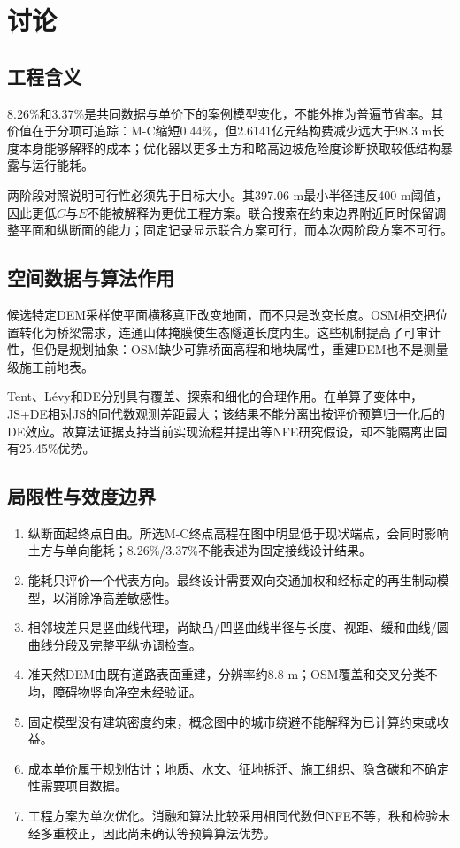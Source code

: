 \documentclass[preprint,12pt]{elsarticle}
\begin{document}
\section{讨论}

\subsection{工程含义}

8.26\%和3.37\%是共同数据与单价下的案例模型变化，不能外推为普遍节省率。其价值在于分项可追踪：M-C缩短0.44\%，但2.6141亿元结构费减少远大于98.3 m长度本身能够解释的成本；优化器以更多土方和略高边坡危险度诊断换取较低结构暴露与运行能耗。

两阶段对照说明可行性必须先于目标大小。其397.06 m最小半径违反400 m阈值，因此更低$C$与$E$不能被解释为更优工程方案。联合搜索在约束边界附近同时保留调整平面和纵断面的能力；固定记录显示联合方案可行，而本次两阶段方案不可行。

\subsection{空间数据与算法作用}

候选特定DEM采样使平面横移真正改变地面，而不只是改变长度。OSM相交把位置转化为桥梁需求，连通山体掩膜使生态隧道长度内生。这些机制提高了可审计性，但仍是规划抽象：OSM缺少可靠桥面高程和地块属性，重建DEM也不是测量级施工前地表。

Tent、L\'evy和DE分别具有覆盖、探索和细化的合理作用。在单算子变体中，JS+DE相对JS的同代数观测差距最大；该结果不能分离出按评价预算归一化后的DE效应。故算法证据支持当前实现流程并提出等NFE研究假设，却不能隔离出固有25.45\%优势。

\subsection{局限性与效度边界}\label{sec:limitations_zh}

\begin{enumerate}[leftmargin=*,label=(\arabic*)]
\item 纵断面起终点自由。所选M-C终点高程在图中明显低于现状端点，会同时影响土方与单向能耗；8.26\%/3.37\%不能表述为固定接线设计结果。
\item 能耗只评价一个代表方向。最终设计需要双向交通加权和经标定的再生制动模型，以消除净高差敏感性。
\item 相邻坡差只是竖曲线代理，尚缺凸/凹竖曲线半径与长度、视距、缓和曲线/圆曲线分段及完整平纵协调检查。
\item 准天然DEM由既有道路表面重建，分辨率约8.8 m；OSM覆盖和交叉分类不均，障碍物竖向净空未经验证。
\item 固定模型没有建筑密度约束，概念图中的城市绕避不能解释为已计算约束或收益。
\item 成本单价属于规划估计；地质、水文、征地拆迁、施工组织、隐含碳和不确定性需要项目数据。
\item 工程方案为单次优化。消融和算法比较采用相同代数但NFE不等，秩和检验未经多重校正，因此尚未确认等预算算法优势。
\end{enumerate}
\end{document}
